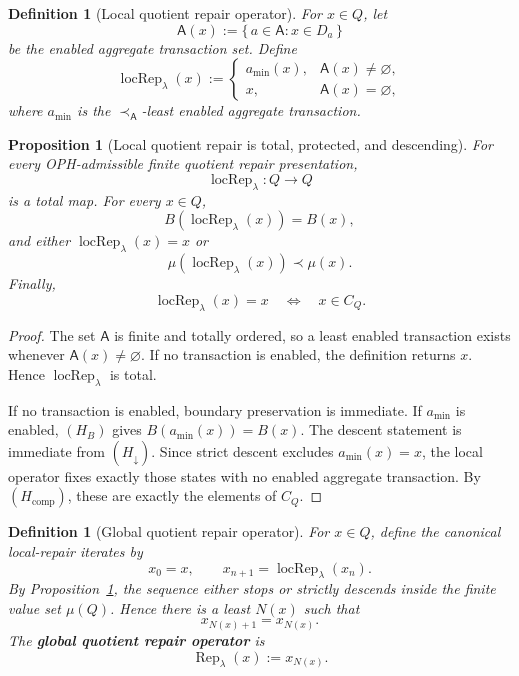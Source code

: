 \documentclass[11pt]{article}
\newtheorem{definition}[theorem]{Definition}
\newtheorem{proposition}[theorem]{Proposition}
\theoremstyle{remark}
\theoremstyle{plain}
\begin{document}
\begin{definition}[Local quotient repair operator]\label{def:local-quotient-repair-operator}
For \(x\in Q\), let
\[
\mathsf A(x):=\{\,a\in\mathsf A:x\in D_a\,\}
\]
be the enabled aggregate transaction set.  Define
\[
\operatorname{locRep}_\lambda(x):=
\begin{cases}
a_{\min}(x),& \mathsf A(x)\ne\varnothing,\\
x,& \mathsf A(x)=\varnothing,
\end{cases}
\]
where \(a_{\min}\) is the \(\prec_{\mathsf A}\)-least enabled aggregate transaction.
\end{definition}

\begin{proposition}[Local quotient repair is total, protected, and descending]\label{prop:local-quotient-repair}
For every OPH-admissible finite quotient repair presentation,
\[
\operatorname{locRep}_\lambda:Q\to Q
\]
is a total map.  For every \(x\in Q\),
\[
B(\operatorname{locRep}_\lambda(x))=B(x),
\]
and either \(\operatorname{locRep}_\lambda(x)=x\) or
\[
\mu(\operatorname{locRep}_\lambda(x))\prec\mu(x).
\]
Finally,
\[
\operatorname{locRep}_\lambda(x)=x
\quad\Longleftrightarrow\quad
x\in C_Q.
\]
\end{proposition}

\begin{proof}
The set \(\mathsf A\) is finite and totally ordered, so a least enabled transaction exists whenever
\(\mathsf A(x)\ne\varnothing\).  If no transaction is enabled, the definition returns \(x\).  Hence
\(\operatorname{locRep}_\lambda\) is total.

If no transaction is enabled, boundary preservation is immediate.  If \(a_{\min}\) is enabled,
\((H_B)\) gives \(B(a_{\min}(x))=B(x)\).  The descent statement is immediate from
\((H_\downarrow)\).  Since strict descent excludes \(a_{\min}(x)=x\), the local operator fixes
exactly those states with no enabled aggregate transaction.  By \((H_{\mathrm{comp}})\), these are
exactly the elements of \(C_Q\).
\end{proof}

\begin{definition}[Global quotient repair operator]\label{def:global-quotient-repair-operator}
For \(x\in Q\), define the canonical local-repair iterates by
\[
x_0=x,\qquad x_{n+1}=\operatorname{locRep}_\lambda(x_n).
\]
By Proposition~\ref{prop:local-quotient-repair}, the sequence either stops or strictly descends
inside the finite value set \(\mu(Q)\).  Hence there is a least \(N(x)\) such that
\[
x_{N(x)+1}=x_{N(x)}.
\]
The \textbf{global quotient repair operator} is
\[
\operatorname{Rep}_\lambda(x):=x_{N(x)}.
\]
\end{definition}
\end{document}
